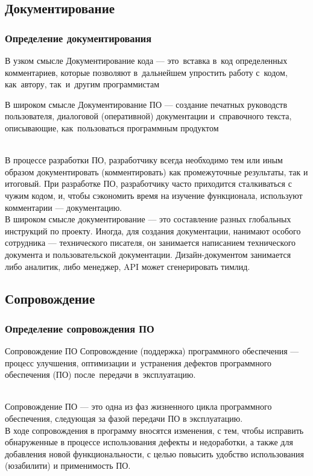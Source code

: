 \documentclass{../industrial-development}
\begin{document}
\subsection{Документирование}
\begin{frame} \frametitle{Определение документирования}
	\begin{minipage}{0.45\textwidth}
		\begin{block}{В узком смысле}
			Документирование кода --- это~вставка в~код определенных комментариев, которые позволяют в~дальнейшем упростить работу с~кодом, как~автору, так~и~другим программистам
		\end{block}
	\end{minipage}
	\hfill
	\begin{minipage}{0.5\textwidth}
		\begin{block}{В широком смысле}
			Документирование ПО --- создание печатных руководств пользователя, диалоговой (оперативной) документации и~справочного текста, описывающие, как~пользоваться программным продуктом
		\end{block}
	\end{minipage}
\end{frame}
\lecturenotes
\\В процессе разработки ПО, разработчику всегда необходимо тем или иным образом документировать (комментировать) как промежуточные результаты, так и итоговый. При разработке ПО, разработчику часто приходится сталкиваться с чужим кодом, и, чтобы сэкономить время на изучение функционала, используют комментарии --- документацию.\\
В широком смысле документирование --- это составление разных глобальных инструкций по проекту. Иногда, для создания документации, нанимают особого сотрудника --- технического писателя, он занимается написанием технического документа и пользовательской документации. Дизайн-документом занимается либо аналитик, либо менеджер, API может сгенерировать тимлид.

\subsection{Сопровождение}
\begin{frame} \frametitle{Определение сопровождения ПО}
	\begin{block}{Сопровождение ПО}
		Сопровождение (поддержка) программного обеспечения --- процесс улучшения, оптимизации и~устранения дефектов программного обеспечения (ПО) после~передачи в~эксплуатацию.
	\end{block}
\end{frame}
\lecturenotes
\\Сопровождение ПО — это одна из фаз жизненного цикла программного обеспечения, следующая за фазой передачи ПО в эксплуатацию.\\
В ходе сопровождения в программу вносятся изменения, с тем, чтобы исправить обнаруженные в процессе использования дефекты и недоработки, а также для добавления новой функциональности, с целью повысить удобство использования (юзабилити) и применимость ПО.\\
\end{document}
